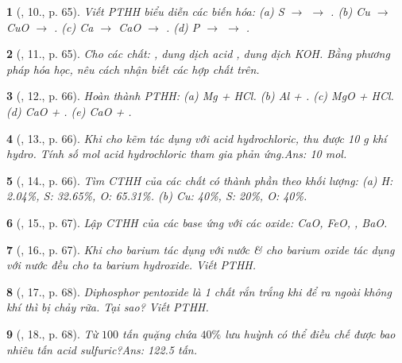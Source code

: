 \documentclass{article}
\newtheorem{baitoan}{}
\begin{document}
\begin{baitoan}[\cite{An_Hoa_Hoc_nang_cao_8_9}, 10., p. 65]
	Viết {\rm PTHH} biểu diễn các biến hóa: (a) {\rm S $\to$  $\to$ }. (b) {\rm Cu $\to$ CuO $\to$ }. (c) {\rm Ca $\to$ CaO $\to$ }. (d) {\rm P $\to$  $\to$ }.
\end{baitoan}

\begin{baitoan}[\cite{An_Hoa_Hoc_nang_cao_8_9}, 11., p. 65]
	Cho các chất: {\rm{}}, dung dịch acid {\rm{}}, dung dịch {\rm KOH}. Bằng phương pháp hóa học, nêu cách nhận biết các hợp chất trên.
\end{baitoan}

\begin{baitoan}[\cite{An_Hoa_Hoc_nang_cao_8_9}, 12., p. 66]
	Hoàn thành {\rm PTHH}: (a) {\rm Mg + HCl}. (b) {\rm Al + }. (c) {\rm MgO + HCl}. (d) {\rm CaO + }. (e) {\rm CaO + }.
\end{baitoan}

\begin{baitoan}[\cite{An_Hoa_Hoc_nang_cao_8_9}, 13., p. 66]
	Khi cho kẽm tác dụng với acid hydrochloric, thu được {\rm10 g} khí hydro. Tính số mol acid hydrochloric tham gia phản ứng.\hfill{\sf Ans: 10 mol.}
\end{baitoan}

\begin{baitoan}[\cite{An_Hoa_Hoc_nang_cao_8_9}, 14., p. 66]
	Tìm {\rm CTHH} của các chất có thành phần theo khối lượng: {\rm(a) H: 2.04\%, S: 32.65\%, O: 65.31\%. (b) Cu: 40\%, S: 20\%, O: 40\%}.
\end{baitoan}

\begin{baitoan}[\cite{An_Hoa_Hoc_nang_cao_8_9}, 15., p. 67]
	Lập {\rm CTHH} của các base ứng với các oxide: {\rm CaO, FeO, , BaO}.
\end{baitoan}

\begin{baitoan}[\cite{An_Hoa_Hoc_nang_cao_8_9}, 16., p. 67]
	Khi cho barium tác dụng với nước \& cho barium oxide tác dụng với nước đều cho ta barium hydroxide. Viết {\rm PTHH}.
\end{baitoan}

\begin{baitoan}[\cite{An_Hoa_Hoc_nang_cao_8_9}, 17., p. 68]
	Diphosphor pentoxide là 1 chất rắn trắng khi để ra ngoài không khí thì bị chảy rữa. Tại sao? Viết {\rm PTHH}.
\end{baitoan}
\begin{baitoan}[\cite{An_Hoa_Hoc_nang_cao_8_9}, 18., p. 68]
	Từ $100$ tấn quặng chứa $40\%$ lưu huỳnh có thể điều chế được bao nhiêu tấn acid sulfuric?\hfill{\sf Ans: 122.5 tấn.}
\end{baitoan}
\end{document}
